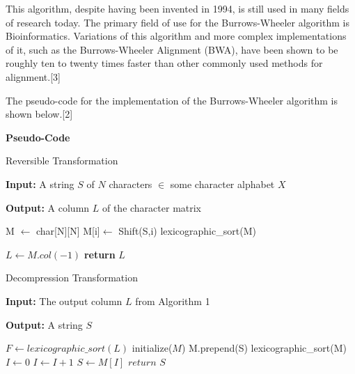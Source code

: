 \documentclass{article}
\begin{document}
   This algorithm, despite having been invented in 1994, is still used in many fields of research today. The primary field of use for the Burrows-Wheeler algorithm is Bioinformatics. Variations of this algorithm and more complex implementations of it, such as the Burrows-Wheeler Alignment (BWA), have been shown to be roughly ten to twenty times faster than other commonly used methods for alignment.[3]
   
   The pseudo-code for the implementation of the Burrows-Wheeler algorithm is shown below.[2]
   
\textbf{Pseudo-Code}

    \begin{algorithm}
    \caption{Reversible Transformation}
    \textbf{Input:} A string $S$ of $N$ characters $\in$ some character alphabet $X$
    
    \textbf{Output:} A column $L$ of the character matrix
        \begin{algorithmic}[1]
            \State M $\gets$ char[N][N]      
                \State M[i]$ \gets$ Shift(S,i) 
            \EndFor
            \State lexicographic\_sort(M)
            
            \State $L \gets M.col(-1)$ 
            \State \textbf{return} $L$
            \EndProcedure
        \end{algorithmic}
    \end{algorithm}
\newpage
    \begin{algorithm}
        \caption{Decompression Transformation}
        \textbf{Input:} The output column $L$ from Algorithm 1
    
    \textbf{Output:} A string $S$
        \begin{algorithmic}[1]
            \State $F \gets lexicographic\_sort(L)$
            \State initialize($M$)
                \State M.prepend(S) 
                \State lexicographic\_sort(M)
            \EndFor
           \State $I\gets 0$
                \State $I\gets I+1$
            \EndWhile
            \State $S \gets M[I]$ 
            \State $return$ $S$
            \EndProcedure
        \end{algorithmic}
    \end{algorithm}
    
\end{document}
